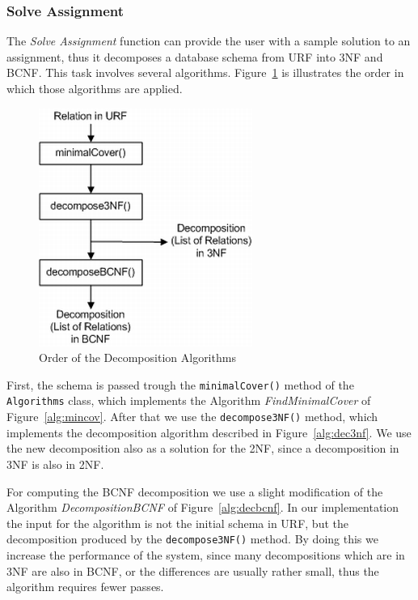 \subsubsection{Solve Assignment}  
The \textit{Solve Assignment} function can provide the user with a sample solution
to an assignment, thus it decomposes a database schema from URF into 3NF and BCNF. This
task involves several algorithms. Figure~\ref{fig:orderdecomposition} is 
illustrates the order in which those algorithms are applied.

\begin{figure}[h]
	\begin{center}
		\includegraphics[scale=0.6]{./img/decomposition1a.png}
		\caption{Order of the Decomposition Algorithms}
		\label{fig:orderdecomposition}
	\end{center}
\end{figure}

First, the schema is passed trough the
\verb=minimalCover()= method of the \verb=Algorithms= class, which
implements the Algorithm \textit{FindMinimalCover} of Figure~\ref{alg:mincov}. 
After that we use the \verb=decompose3NF()= method, which implements the 
decomposition algorithm described in Figure~\ref{alg:dec3nf}. 
We use the new decomposition also as a solution for the 2NF, since
a decomposition in 3NF is also in 2NF. 

For computing the BCNF decomposition we use 
a slight modification of the Algorithm \textit{DecompositionBCNF} of Figure~\ref{alg:decbcnf}.
In our implementation
the input for the algorithm is not the initial schema in URF, but the decomposition
produced by the \verb=decompose3NF()= method. By doing this we 
increase the performance of the system, since many decompositions which 
are in 3NF are also in BCNF, or the differences are usually rather small, thus the algorithm
requires fewer passes.   
  
